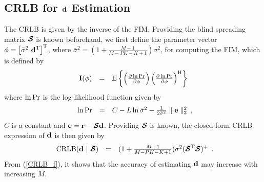 \documentclass[a4paper,10pt,fleqn, twocolumn]{IEEETran}
\newcommand{\br}{{\mathbf r}}
\newcommand{\bd}{{\bf d}}
\newcommand{\bbf}{{\bf d}}
\newcommand{\bI}{{\bf I}}
\newcommand{\bcS}{{\mbox {\boldmath ${\cal S}$}}}
\begin{document}
\subsection{CRLB for $\bd$ Estimation}
The CRLB is given by the inverse of the FIM. Providing the blind
spreading matrix $\bcS$ is known beforehand, we first define the
parameter vector $\mathbf{\phi} = \left[\bar{\sigma}^{2}\
\bbf^{\rm T}\right]^{\rm T}$, where $\bar{\sigma}^{2}
=(1+\frac{M-1}{M-PK-K+1})\sigma^{2}$, for computing the FIM, which
is defined by
\begin{equation}
\begin{array}{rcl}
\bI(\mathbf{\phi}) &=& {\rm E} \left\{ \left( \frac{\partial
\ln{\rm Pr}}{\partial \mathbf{\phi}} \right) \left( \frac{\partial
\ln{\rm Pr}}{\partial \mathbf{\phi}} \right)^{\rm H} \right\}
\label{fim}
\end{array}
\end{equation}
\noindent where $\ln{\rm Pr}$ is the log-likelihood function given
by
\begin{equation}
\begin{array}{rcl}
\ln{\rm
Pr}&=&C-L\ln\bar{\sigma}^2-\frac{1}{2\bar{\sigma}^2}\parallel\mathbf{e}\parallel_2^2
\end{array},\label{logl}
\end{equation}
\noindent $C$ is a constant and $\mathbf{e}=\br-\bcS\bbf$.
Providing $\bcS$ is known, the closed-form CRLB expression of
$\bbf$ is then given by
\begin{equation}
\begin{array}{rcl}
{\rm CRLB}(\bbf\ |\ \bcS) &
=&(1+\frac{M-1}{M-PK-K+1})\sigma^{2}(\bcS^{\rm T}\bcS)^{\rm +}
\end{array}.\label{CRLB_f}
\end{equation}
\noindent From (\ref{CRLB_f}), it shows that the accuracy of
estimating $\bbf$ may increase with increasing $M$.
\end{document}
